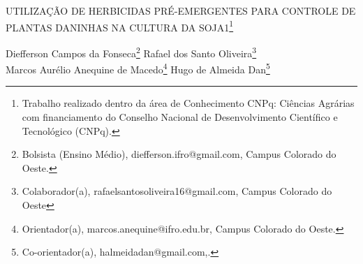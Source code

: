 \documentclass[article,12pt,onesidea,4paper,english,brazil]{abntex2}
\begin{document}
	
	
	\frenchspacing 
	
	\begin{center}
		\LARGE UTILIZAÇÃO DE HERBICIDAS PRÉ-EMERGENTES PARA CONTROLE DE
		PLANTAS DANINHAS NA CULTURA DA SOJA1\footnote{Trabalho realizado dentro da área de Conhecimento CNPq: Ciências Agrárias com financiamento do
			Conselho Nacional de Desenvolvimento Científico e Tecnológico (CNPq).}
		
		\normalsize
		Diefferson Campos da Fonseca\footnote{Bolsista (Ensino Médio), diefferson.ifro@gmail.com, Campus Colorado do Oeste.} 
	Rafael dos Santo Oliveira\footnote{Colaborador(a), rafaelsantosoliveira16@gmail.com, Campus Colorado do Oeste} \\
	Marcos Aurélio Anequine de Macedo\footnote{Orientador(a), marcos.anequine@ifro.edu.br, Campus Colorado do Oeste.} 
		Hugo de Almeida Dan\footnote{Co-orientador(a), halmeidadan@gmail.com,.} 
	\end{center}
	
\end{document}
